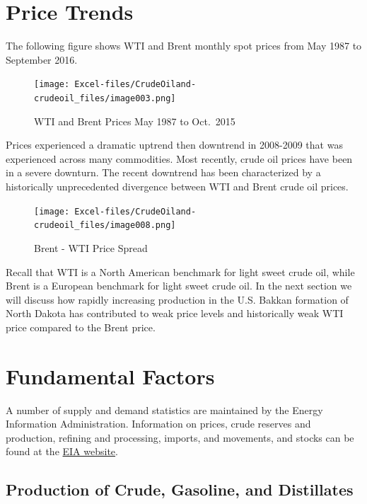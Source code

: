 \documentclass[
  letterpaper,
  DIV=11,
  numbers=noendperiod]{scrreprt}
\begin{document}
\section{Price Trends}\label{price-trends}

The following figure shows WTI and Brent monthly spot prices from May
1987 to September 2016.

\begin{figure}[H]

{\centering \texttt{[image: Excel-files/CrudeOiland-crudeoil\_files/image003.png]}

}

\caption{WTI and Brent Prices May 1987 to Oct.~2015}

\end{figure}%

Prices experienced a dramatic uptrend then downtrend in 2008-2009 that
was experienced across many commodities. Most recently, crude oil prices
have been in a severe downturn. The recent downtrend has been
characterized by a historically unprecedented divergence between WTI and
Brent crude oil prices.

\begin{figure}[H]

{\centering \texttt{[image: Excel-files/CrudeOiland-crudeoil\_files/image008.png]}

}

\caption{Brent - WTI Price Spread}

\end{figure}%

Recall that WTI is a North American benchmark for light sweet crude oil,
while Brent is a European benchmark for light sweet crude oil. In the
next section we will discuss how rapidly increasing production in the
U.S. Bakkan formation of North Dakota has contributed to weak price
levels and historically weak WTI price compared to the Brent price.

\section{Fundamental Factors}\label{fundamental-factors}

A number of supply and demand statistics are maintained by the Energy
Information Administration. Information on prices, crude reserves and
production, refining and processing, imports, and movements, and stocks
can be found at the \href{http://www.eia.gov/petroleum/data.cfm}{EIA
website}.

\subsection{Production of Crude, Gasoline, and
Distillates}\label{production-of-crude-gasoline-and-distillates}
\end{document}
